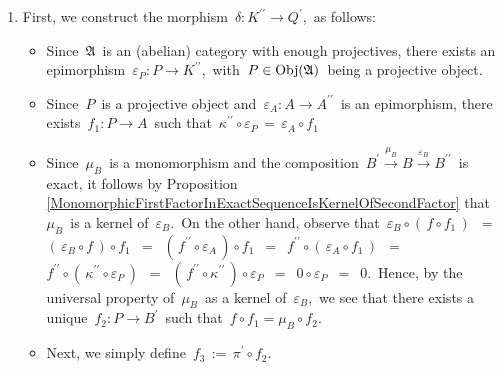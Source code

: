 \begin{enumerate}
\item
	First, we construct the morphism \,$\delta : K^{\prime\prime} \longrightarrow Q^{\prime}$,\, as follows:
	\begin{itemize}
	\item
		Since \,$\mathfrak{A}$\, is an (abelian) category with enough projectives,
		there exists an epimorphism
		\,$\varepsilon_{P} : P \longrightarrow K^{\prime\prime}$,\,
		with \,$P \in \textnormal{Obj}(\mathfrak{A})$\, being a projective object.
	\item
		Since \,$P$\, is a projective object and 
		\,$\varepsilon_{A} : A \longrightarrow A^{\prime\prime}$\,
		is an epimorphism, there exists
		\,$f_{1} : P \longrightarrow A$\,
		such that
		\,$\kappa^{\prime\prime} \circ \varepsilon_{P} \,=\, \varepsilon_{A} \circ f_{1}$\,
	\item
		Since \,$\mu_{B}$\, is a monomorphism
		and the composition
		\,$B^{\prime} \overset{\mu_{B}}{\longrightarrow} B \overset{\varepsilon_{B}}{\longrightarrow} B^{\prime\prime}$\,
		is exact, it follows
		by Proposition \ref{MonomorphicFirstFactorInExactSequenceIsKernelOfSecondFactor}
		that
		\,$\mu_{B}$\, is a kernel of \,$\varepsilon_{B}$.\,
		On the other hand, observe that
		\,$\varepsilon_{B} \circ (\,f \circ f_{1}\,)$
		\,$=$\, $(\,\varepsilon_{B} \circ f\,) \circ f_{1}$
		\,$=$\, $(\,f^{\prime\prime} \circ \varepsilon_{A}\,) \circ f_{1}$
		\,$=$\, $f^{\prime\prime} \circ (\,\varepsilon_{A} \circ f_{1}\,)$
		\,$=$\, $f^{\prime\prime} \circ (\,\kappa^{\prime\prime} \circ \varepsilon_{P}\,)$
		\,$=$\, $(\,f^{\prime\prime} \circ \kappa^{\prime\prime}\,) \circ \varepsilon_{P}$
		\,$=$\, $0 \circ \varepsilon_{P}$
		\,$=$\, $0$.\,
		Hence, by the universal property of
		\,$\mu_{B}$\, as a kernel of \,$\varepsilon_{B}$,\,
		we see that there exists a unique
		\,$f_{2} : P \longrightarrow B^{\prime}$\,
		such that
		\,$f \circ f_{1} = \mu_{B} \circ f_{2}$.\,
	\item
		Next, we simply define
		\,$f_{3} \,:=\, \pi^{\prime} \circ f_{2}$.\,
	\end{itemize}

\end{enumerate}
